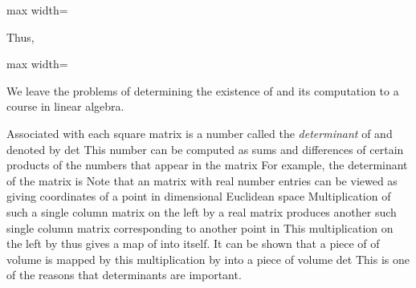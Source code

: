 \documentclass[11pt,oneside]{article}
\begin{document}
\begin{BookBody}
\begin{center}\begin{adjustbox}{max width=\linewidth}\end{adjustbox}\end{center}

\noindent Thus,

\begin{center}\begin{adjustbox}{max width=\linewidth}\end{adjustbox}\end{center} \BookEnd{\blacktriangle}

We leave the problems of determining the existence of  and its computation to a course in linear algebra.

Associated with each square  matrix  is a number called the\textit{ determinant} of  and denoted by det This number can be computed as sums and differences of certain products of the numbers that appear in the matrix  For example, the determinant of the  matrix  is  Note that an  matrix with real number entries can be viewed as giving coordinates of a point in dimensional Euclidean space  Multiplication of such a single column matrix on the left by a real  matrix  produces another such single column matrix corresponding to another point in  This multiplication on the left by  thus gives a map of  into itself. It can be shown that a piece of  of volume  is mapped by this multiplication by  into a piece of volume \BookInline{|}det This is one of the reasons that determinants are important.


\end{BookBody}
\end{document}
